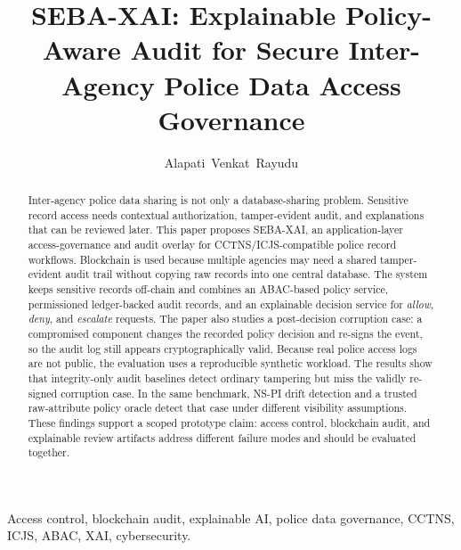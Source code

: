 \documentclass[journal]{IEEEtran}
\begin{document}
\title{SEBA-XAI: Explainable Policy-Aware Audit for Secure Inter-Agency Police Data Access Governance}

\author{Alapati~Venkat~Rayudu}

\maketitle

\begin{abstract}
Inter-agency police data sharing is not only a database-sharing problem.
Sensitive record access needs contextual authorization, tamper-evident audit,
and explanations that can be reviewed later. This paper proposes SEBA-XAI, an
application-layer access-governance and audit overlay for CCTNS/ICJS-compatible
police record workflows. Blockchain is used because multiple agencies may need a
shared tamper-evident audit trail without copying raw records into one central
database. The system keeps sensitive records off-chain and combines an
ABAC-based policy service, permissioned ledger-backed audit records, and an
explainable decision service for \emph{allow}, \emph{deny}, and
\emph{escalate} requests. The paper also studies a post-decision corruption
case: a compromised component changes the recorded policy decision and re-signs
the event, so the audit log still appears cryptographically valid. Because real
police access logs are not public, the evaluation uses a reproducible synthetic
workload. The results show that integrity-only audit baselines detect ordinary
tampering but miss the validly re-signed corruption case. In the same benchmark,
NS-PI drift detection and a trusted raw-attribute policy oracle detect that case
under different visibility assumptions. These findings support a scoped
prototype claim: access control, blockchain audit, and explainable review
artifacts address different failure modes and should be evaluated together.
\end{abstract}

\begin{IEEEkeywords}
Access control, blockchain audit, explainable AI, police data governance,
CCTNS, ICJS, ABAC, XAI, cybersecurity.
\end{IEEEkeywords}










\end{document}

